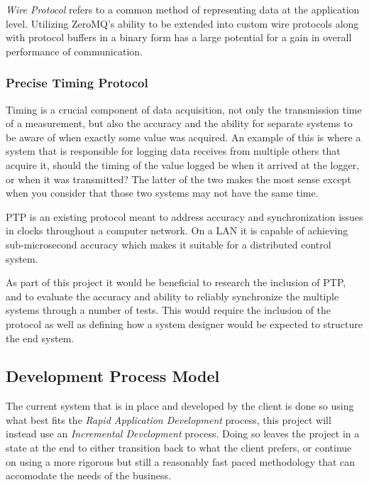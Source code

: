 \documentclass[11pt]{article}
\begin{document}
        \emph{Wire Protocol} refers to a common method of representing data at
        the application level. Utilizing ZeroMQ's ability to be extended into
        custom wire protocols along with protocol buffers in a binary form has
        a large potential for a gain in overall performance of communication.

      \subsubsection{Precise Timing Protocol}\label{sec:soln-innov-ptp}

        Timing is a crucial component of data acquisition, not only the
        transmission time of a measurement, but also the accuracy and the
        ability for separate systems to be aware of when exactly some value
        was acquired. An example of this is where a system that is responsible
        for logging data receives from multiple others that acquire it, should
        the timing of the value logged be when it arrived at the logger, or
        when it was transmitted? The latter of the two makes the most sense
        except when you consider that those two systems may not have the same
        time.

        PTP is an existing protocol meant to address accuracy and
        synchronization issues in clocks throughout a computer network. On a
        LAN it is capable of achieving sub-microsecond accuracy which makes
        it suitable for a distributed control system.

        As part of this project it would be beneficial to research the
        inclusion of PTP, and to evaluate the accuracy and ability to reliably
        synchronize the multiple systems through a number of tests. This would
        require the inclusion of the protocol as well as defining how a system
        designer would be expected to structure the end system.

      \subsection{Development Process Model}\label{sec:soln-model}

        The current system that is in place and developed by the client is done
        so using what best fits the \emph{Rapid Application Development} process,
        this project will instead use an \emph{Incremental Development} process.
        Doing so leaves the project in a state at the end to either transition
        back to what the client prefers, or continue on using a more rigorous but
        still a reasonably fast paced methodology that can accomodate the needs
        of the business.
\end{document}

